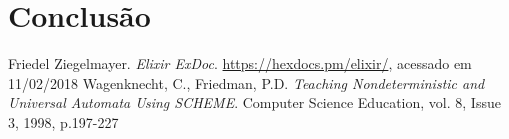 \documentclass[conference]{IEEEtran}
\begin{document}
\section{Conclusão}


\begin{thebibliography}{1}
Friedel Ziegelmayer. \emph{Elixir ExDoc}. \url{https://hexdocs.pm/elixir/}, acessado em 11/02/2018
Wagenknecht, C., Friedman, P.D. \emph{Teaching Nondeterministic and Universal Automata Using SCHEME}. Computer Science Education, vol. 8, Issue 3, 1998, p.197-227
\end{thebibliography}
\end{document}
